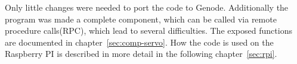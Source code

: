 Only little changes were needed to port the code to Genode. Additionally the program was made a complete component, which can be called via remote procedure calls(RPC), which lead to several difficulties. The exposed functions are documented in chapter~\ref{sec:comp-servo}. How the code is used on the Raspberry PI is described in more detail in the following chapter~\ref{sec:rpi}.